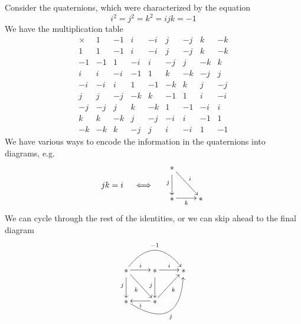 Consider the quaternions, which were characterized by the
equation
\begin{equation}%
i^2 = j^2 = k^2 = ijk = -1
\end{equation}
We have the multiplication table
\begin{equation}%
\begin{array}{c|cccccccc}
\times &  1  & -1  &  i  & -i  &  j  & -j  &  k  &  -k\\\hline
1      &  1  & -1  &  i  & -i  &  j  & -j  &  k  &  -k\\
-1     & -1  &  1  & -i  &  i  & -j  &  j  & -k  &   k\\
i      &  i  & -i  & -1  &  1  &  k  & -k  & -j  &   j\\
-i     & -i  &  i  &  1  & -1  & -k  &  k  &  j  &  -j\\
j      &  j  & -j  & -k  &  k  & -1  &  1  &  i  &  -i\\
-j     & -j  &  j  &  k  & -k  &  1  & -1  & -i  &   i\\
k      &  k  & -k  &  j  & -j  & -i  &  i  & -1  &   1\\
-k     & -k  &  k  & -j  &  j  &  i  & -i  &  1  &  -1
\end{array}
\end{equation}
We have various ways to encode the information in the quaternions
into diagrams, e.g.
\begin{equation}%
jk=i\quad\iff\quad
\vcenter{
\xymatrix{
\txt{*}\ar[d]_{j}\ar[dr]^{i} & \\
\txt{*}\ar[r]_{k} & \txt{*}
}}
\end{equation}
We can cycle through the rest of the identities, or we can skip
ahead to the final diagram
\begin{equation}
\vcenter{
\xymatrix{            &                              & \\
\txt{*} \ar@/^2pc/[uurrdd]^{-1}
\ar[d]_{j} 
\ar[dr]_{k} 
\ar[r]^{i}       & \txt{*} \ar[r]^{i} \ar[d]_{j} & \txt{*}  \\
\txt{*}\ar@/_3pc/[dddrruuuu]_{j}             & \txt{*}\ar[l]^{i}   \ar[ur]_{k}          &
  }}
\end{equation}
